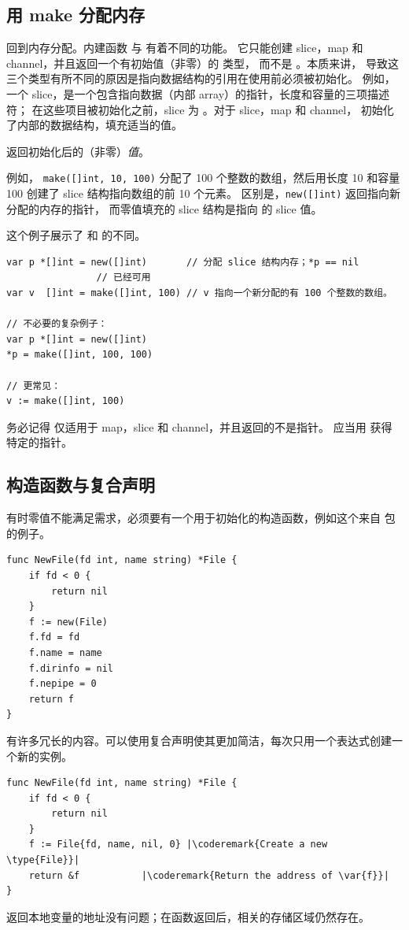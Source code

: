 \subsection{用 make 分配内存}
\label{sec:allocation with make}
回到内存分配。内建函数  与  有着不同的功能。
它只能创建 slice，map 和 channel，并且返回一个有初始值（非零）的  类型，
而不是 。本质来讲，
导致这三个类型有所不同的原因是指向数据结构的引用在使用前必须被初始化。
例如，一个 slice，是一个包含指向数据（内部 array）的指针，长度和容量的三项描述符；
在这些项目被初始化之前，slice 为 。对于 slice，map 和 channel，
 初始化了内部的数据结构，填充适当的值。

\begin{lbar}
 返回初始化后的（非零）\emph{值}。
\end{lbar}

例如，
\lstinline{make([]int, 10, 100)}
分配了 100 个整数的数组，然后用长度 10 和容量 100 创建了 slice 
结构指向数组的前 10 个元素。
区别是，\lstinline{new([]int)} 返回指向新分配的内存的指针，
而零值填充的 slice 结构是指向  的 slice 值。

这个例子展示了  和  的不同。
\begin{lstlisting}
var p *[]int = new([]int)       // 分配 slice 结构内存；*p == nil
				// 已经可用
var v  []int = make([]int, 100) // v 指向一个新分配的有 100 个整数的数组。

// 不必要的复杂例子：
var p *[]int = new([]int)
*p = make([]int, 100, 100)

// 更常见：
v := make([]int, 100)
\end{lstlisting}
务必记得  仅适用于 map，slice 和 channel，并且返回的不是指针。
应当用  获得特定的指针。

\subsection{构造函数与复合声明}
有时零值不能满足需求，必须要有一个用于初始化的构造函数，例如这个来自
 包的例子。
\begin{lstlisting}
func NewFile(fd int, name string) *File {
    if fd < 0 {
        return nil
    }
    f := new(File)
    f.fd = fd
    f.name = name
    f.dirinfo = nil
    f.nepipe = 0
    return f
}
\end{lstlisting}
有许多冗长的内容。可以使用复合声明使其更加简洁，每次只用一个表达式创建一个新的实例。

\begin{lstlisting}
func NewFile(fd int, name string) *File {
    if fd < 0 {
        return nil
    }
    f := File{fd, name, nil, 0}	|\coderemark{Create a new \type{File}}|
    return &f			|\coderemark{Return the address of \var{f}}|
}
\end{lstlisting}
返回本地变量的地址没有问题；在函数返回后，相关的存储区域仍然存在。

